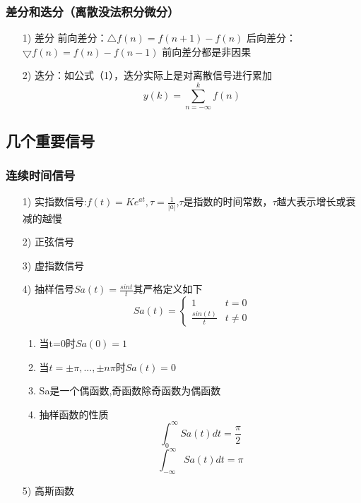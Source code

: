 \documentclass{ctexart}
\numberwithin{figure}{section}
\numberwithin{equation}{section}
\begin{document}
        \subsubsection{差分和迭分（离散没法积分微分）}
            \begin{enumerate}
                \item[1)] 差分
                \subitem 前向差分：$\bigtriangleup f(n)=f(n+1)-f(n)$
                \subitem 后向差分：$\bigtriangledown f(n)=f(n)-f(n-1)$
                \subitem 前向差分都是非因果
                \item[2)] 迭分：如公式（1），迭分实际上是对离散信号进行累加
                \begin{equation}
                    y(k)=\sum_{n = -\infty}^{k} f(n) 
                \end{equation}
            \end{enumerate}
    \subsection{几个重要信号}
        \subsubsection{连续时间信号}
            \begin{enumerate}
                \item[1)] 实指数信号:$\displaystyle f(t)=Ke^{at},\tau = \frac{1}{\left\lvert a \right\rvert }$,$\tau$是指数的时间常数，$\tau$越大表示增长或衰减的越慢
                \item[2)] 正弦信号
                \item[3)] 虚指数信号
                \item[4)] 抽样信号$\displaystyle Sa(t)=\frac{sint}{t}$其严格定义如下
                $$Sa(t)=
                \begin{cases}
                    1 & t=0\\
                    \displaystyle \frac{sin(t)}{t} & t\neq 0
                \end{cases}
                $$
                \begin{enumerate}
                    \item 当t=0时$Sa(0)=1$
                    \item 当$t=\pm \pi,...,\pm n\pi$时$Sa(t)=0$
                    \item Sa是一个偶函数,奇函数除奇函数为偶函数
                    \item 抽样函数的性质
                        \begin{equation}
                            \int_{0}^{\infty} Sa(t)dt=\frac{\pi}{2}
                        \end{equation}
                        \begin{equation}
                            \int_{-\infty}^{\infty} Sa(t)dt=\pi
                        \end{equation}
                \end{enumerate}
                \item[5)] 高斯函数
            \end{enumerate}
\end{document}
